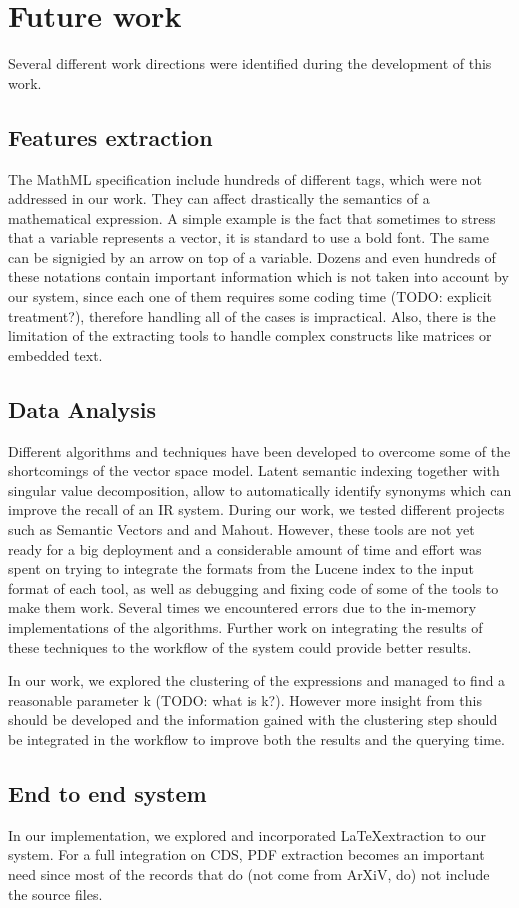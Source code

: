 \chapter{Future work}
\label{chap-future_work}

Several different work directions were identified during the development of this work. 

\section{Features extraction}
The MathML specification include hundreds of different tags, which were not addressed in our work. They can affect drastically the semantics of a mathematical expression. A simple example is the fact that sometimes to stress that a variable represents a vector, it is standard to use a bold font. The same can be signigied by an arrow on top of a variable. Dozens and even hundreds of these notations contain important information which is not taken into account by our system, since each one of them requires some coding time (TODO: explicit treatment?), therefore handling all of the cases is impractical. Also, there is the limitation of the extracting tools to handle complex constructs like matrices or embedded text.

\section{Data Analysis}
Different algorithms and techniques have been developed to overcome some of the shortcomings of the vector space model. Latent semantic indexing together with singular value decomposition, allow to automatically identify synonyms which can improve the recall of an IR system. During our work, we tested different projects such as Semantic Vectors\cite{semantic_vectors} and \cite{mallet} and Mahout. However, these tools are not yet ready for a big deployment and a considerable amount of time and effort was spent on trying to integrate the formats from the Lucene index to the input format of each tool, as well as debugging and fixing code of some of the tools to make them work. Several times we encountered errors due to the in-memory implementations of the algorithms. Further work on integrating the results of these techniques to the workflow of the system could provide better results. 

In our work, we explored the clustering of the expressions and managed to find a reasonable parameter k (TODO: what is k?). However more insight from this should be developed and the information gained with the clustering step should be integrated in the workflow to improve both the results and the querying time. 

\section{End to end system}
In our implementation, we explored and incorporated \LaTeX extraction to our system. For a full integration on CDS, PDF extraction becomes an important need since most of the records that do (not come from ArXiV, do) not include the source files.
